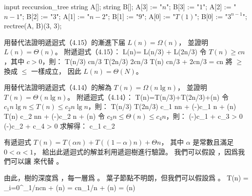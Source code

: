 \startMPcode
	input reccursion_tree
	string A[];
	string B[];
	A[3] := "$n$";		B[3] := "$1$";
	A[2] := "$n-1$";	B[2] := "$3$";
	A[1] := "$n-2$";	B[1] := "$9$";
	A[0] := "$T(1)$";	B[0] := "$3^{n-1}$";
	rectree(A, B)(3, 3);
\stopMPcode
\stopANSWER
\stopitem
\stopigBase
\stopEXERCISE

\startEXERCISE
用替代法證明遞迴式（4.15）的漸進下届 $L(n)=\Omega(n)$，
並證明 $L(n)=\Theta(n)$。
附遞迴式（4.15）：
\startformula
L(n)=\startmathcases
{} \NC \qquad {} \NR
\NC L(n/3) + L(2n/3) \NC \qquad {} \NR
\stopmathcases
\stopformula
\stopEXERCISE
\startANSWER
令 $T(n)\ge cn$，其中 $c>0$，則：
\startformula\startmathalignment
\NC T(n/3) \NC \ge cn/3 \NR
\NC T(2n/3) \NC \ge 2cn/3 \NR
\NC T(n) \NC \ge cn/3 + 2cn/3 \NR
\NC \NC = cn \NR
\stopmathalignment\stopformula
將 $\ge$ 換成 $\le$ 一樣成立，
因此 $L(n)=\Theta(N)$。
\stopANSWER

\startEXERCISE
用替代法證明遞迴式（4.14）的解為 $T(n)=\Omega(n\lg n)$，
並證明 $T(n)=\Theta(n\lg n)$。
附遞迴式（4.14）：
\startformula
T(n)=T(n/3)+T(2n/3)+\Theta(n)
\stopformula
\stopEXERCISE
\startANSWER
令 $c_1 n\lg n \le T(n) \le c_2 n\lg n$，則：
\startformula\startmathalignment[n=4,align={right,middle,left}]
\NC {}\lg {} \le \NC T(n/3) \NC \le {}\lg {} \NR
\NC {}\lg {} \le \NC T(2n/3) \NC \le {}\lg {} \NR
\NC c_1 n\lg n + (-)c_1 n + \Theta(n) \le
	\NC T(n)
	\NC \le c_2 n\lg n + (-)c_2 n + \Theta(n) \NR
\stopmathalignment\stopformula
令 $c_3 n\le \Theta(n)\le c_4 n$，則：
\startformula
\NC (-)c_1 + c_3 \NC > 0 \NR
\NC (-)c_2 + c_4 \NC > 0 \NR
\stopformula
求解得：
\startformula
\NC c_1 \NC \le {} \NR
\NC c_2 \NC \ge {} \NR
\stopformula
\stopANSWER

有遞迴式 $T(n) = T(\alpha n) + T((1-\alpha)n) + \Theta n$，
其中 $\alpha$ 是常數且滿足 $0 < \alpha < 1$，
給出此遞迴式的解並利用遞迴樹進行驗證。
\stopEXERCISE
\startANSWER
我們可以假設 ，因爲我們可以讓  來代替 \m{\alpha}。

由此，樹的深度爲 ，每一層爲 。
葉子節點不明朗，但我們可以假設爲 。
\startformula\startmathalignment
\NC T(n) \NC = \sum_{i=0}^{\log_{1/\alpha}n}cn + \Theta(n) \NR
\NC      \NC = cn\log_{1/\alpha}n + \Theta(n) \NR
\NC      \NC = \Theta(n) \NR
\stopmathalignment\stopformula

